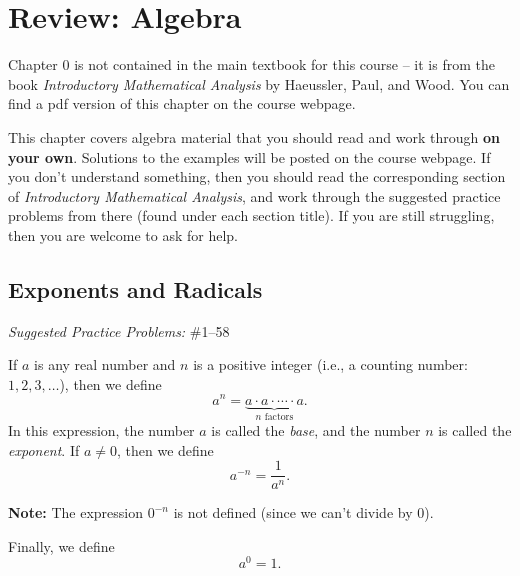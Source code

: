 \documentclass[letterpaper,12pt,oneside]{book}
\theoremstyle{definition}
\newcommand{\practicesection}[2]{%
    \section{#1}
    \textit{Suggested Practice Problems:} #2
    \smallskip%
}
\begin{document}
\setcounter{chapter}{-1}

\chapter{Review: Algebra}

Chapter 0 is not contained in the main textbook for this course -- it is from the book \emph{Introductory Mathematical Analysis} by Haeussler, Paul, and Wood.  You can find a pdf version of this chapter on the course webpage.  

This chapter covers algebra material that you should read and work through \textbf{on your own}.  Solutions to the examples will be posted on the course webpage.  If you don't understand something, then you should read the corresponding section of \emph{Introductory Mathematical Analysis}, and work through the suggested practice problems from there (found under each section title).  If you are still struggling, then you are welcome to ask for help.

\setcounter{section}{2}

\practicesection{Exponents and Radicals}{\#1--58}

\thispagestyle{chapter}

\noindent
If $a$ is any real number and $n$ is a positive integer (i.e., a counting number: $1,2,3,\ldots$), then we define
\[
a^n=\underbrace{a\cdot a\cdot \cdots \cdot a}_{n\text{ factors}}.
\]
In this expression, the number $a$ is called the \emph{base}, and the number $n$ is called the \emph{exponent}.
If $a\neq 0$, then we define
\[
a^{-n}=\frac{1}{a^n}.
\]

\noindent
\textbf{Note:} The expression $0^{-n}$ is not defined (since we can't divide by $0$).

\smallskip

\noindent
Finally, we define
\[
a^0=1.
\]
\end{document}
